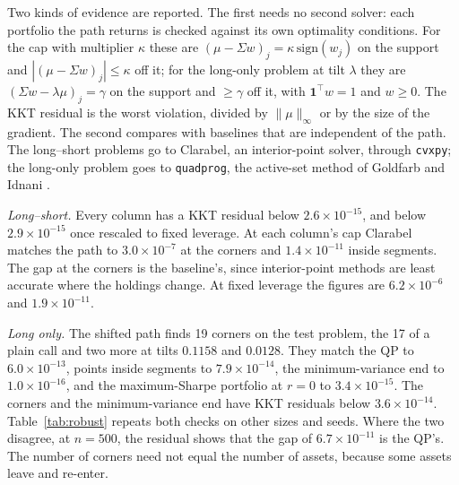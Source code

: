 \documentclass[11pt]{article}
\newcommand{\trans}{^{\top}}
\newcommand{\Sig}{\Sigma}
\begin{document}
Two kinds of evidence are reported. The first needs no second solver: each portfolio
the path returns is checked against its own optimality conditions. For the cap with
multiplier $\kappa$ these are $(\mu-\Sig w)_j=\kappa\,\mathrm{sign}(w_j)$ on the support
and $|(\mu-\Sig w)_j|\le\kappa$ off it; for the long-only problem at tilt $\lambda$ they are
$(\Sig w-\lambda\mu)_j=\gamma$ on the support and $\ge\gamma$ off it, with
$\mathbf 1\trans w=1$ and $w\ge0$. The KKT residual is the worst violation, divided by
$\|\mu\|_\infty$ or by the size of the gradient. The second compares with baselines that
are independent of the path. The long--short problems go to Clarabel, an interior-point
solver, through \texttt{cvxpy}; the long-only problem goes to \texttt{quadprog}, the
active-set method of Goldfarb and Idnani \cite{goldfarb1983}.

\emph{Long--short.} Every column has a KKT residual below $2.6\times10^{-15}$, and
below $2.9\times10^{-15}$ once rescaled to fixed leverage. At each column's cap Clarabel matches the path to
$3.0\times10^{-7}$ at the corners and $1.4\times10^{-11}$ inside segments. The gap at the
corners is the baseline's, since interior-point methods are least accurate where the
holdings change. At fixed leverage the figures are $6.2\times10^{-6}$ and
$1.9\times10^{-11}$.

\emph{Long only.} The shifted path finds 19 corners on the test problem, the 17 of a
plain call and two more at tilts $0.1158$ and $0.0128$. They match the QP to
$6.0\times10^{-13}$, points inside segments to $7.9\times10^{-14}$, the
minimum-variance end to $1.0\times10^{-16}$, and the maximum-Sharpe portfolio at $r=0$
to $3.4\times10^{-15}$. The corners and the minimum-variance end have KKT residuals below
$3.6\times10^{-14}$. Table~\ref{tab:robust} repeats both checks on other sizes and seeds.
Where the two disagree, at $n=500$, the residual shows that the gap of
$6.7\times10^{-11}$ is the QP's.
The number of corners need not equal the number of assets, because some assets leave
and re-enter.
\end{document}
